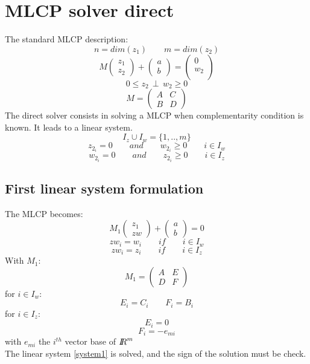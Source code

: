 \section{MLCP solver direct}
The standard MLCP description:
\[n=dim(z_{1}) \qquad m=dim(z_{2})\]
\[M \left(\begin{array}{c} z_{1}\\z_{2} \end{array}\right)+\left(\begin{array}{c} a\\b \end{array}\right)=\left(\begin{array}{c} 0\\w_{2}\\ \end{array}\right)\]
\[0 \leq z_{2} \, \perp \, w_{2} \geq 0\]
\[M=\left(\begin{array}{cc} A&C\\B&D \end{array}\right)\]
The direct solver consists in solving a MLCP when complementarity condition is known. It leads to a
linear system.
\[I_{z} \cup I_{w} = \{ 1,..,m\}\]
\[z_{2_{i}}=0 \qquad and \qquad w_{2_{i}} \geq 0 \qquad i \in I_{w} \]
\[w_{2_{i}}=0 \qquad and \qquad z_{2_{i}} \geq 0 \qquad i \in I_{z} \]

\subsection{First linear system formulation}
The MLCP becomes:\\
\[\label{system1} M_{1} \left(\begin{array}{c} z_{1}\\zw \end{array}\right)+\left(\begin{array}{c} a\\b
\end{array}\right)=0 \]
\[zw_{i}=w_{i} \qquad if \qquad i \in I_{w}\]
\[zw_{i}=z_{i} \qquad if \qquad i \in I_{z}\]
With $M_{1}$:
\[M_{1}=\left(\begin{array}{cc} A&E\\D&F \end{array}\right)\]
for $i \in I_w$:
\[E_{i}=C_{i} \qquad F_{i}=B_{i} \]
for $i \in I_z$:
\[E_{i}=0 \]
\[F_{i}=-e_{mi}\]
with $e_{mi}$ the $i^{th}$ vector base of $\mbox{\rm $I\!\!R$}^m$\\
The linear system \ref{system1} is solved, and the sign of the solution must be check.
